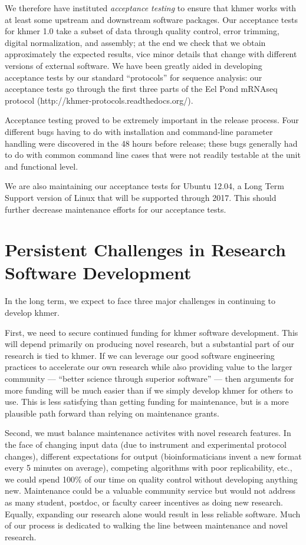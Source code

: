 \documentclass[12pt]{article}
\begin{document}
We therefore have instituted {\em acceptance testing} to ensure that
khmer works with at least some upstream and downstream software
packages.  Our acceptance tests for khmer 1.0 take a subset of data
through quality control, error trimming, digital normalization, and
assembly; at the end we check that we obtain approximately the
expected results, vice minor details that change with different
versions of external software.  We have been greatly aided in
developing acceptance tests by our standard ``protocols'' for sequence
analysis: our acceptance tests go through the first three parts of the
Eel Pond mRNAseq protocol (http://khmer-protocols.readthedocs.org/).

Acceptance testing proved to be extremely important in the release
process.  Four different bugs having to do with installation and
command-line parameter handling were discovered in the 48 hours before
release; these bugs generally had to do with common command line cases
that were not readily testable at the unit and functional level.

We are also maintaining our acceptance tests for Ubuntu 12.04, a Long
Term Support version of Linux that will be supported through 2017.
This should further decrease maintenance efforts for our acceptance
tests.

\section{Persistent Challenges in Research Software Development}

In the long term, we expect to face three major challenges in continuing
to develop khmer.

First, we need to secure continued funding for khmer software
development.  This will depend primarily on producing novel research,
but a substantial part of our research is tied to khmer.  If we can
leverage our good software engineering practices to accelerate our own
research while also providing value to the larger community ---
``better science through superior software'' --- then arguments for more
funding will be much easier than if we simply develop khmer for
others to use.  This is less satisfying than getting funding for maintenance,
but is a more plausible path forward than relying on maintenance grants.

Second, we must balance maintenance activites with novel research
features.  In the face of changing input data (due to instrument and
experimental protocol changes), different expectations for output
(bioinformaticians invent a new format every 5 minutes on average),
competing algorithms with poor replicability, etc., we could spend
100\% of our time on quality control without developing anything new.
Maintenance could be a valuable community service but would not address
as many student, postdoc, or faculty career incentives as doing new
research.  Equally, expanding our research alone would result in less
reliable software.  Much of our process is dedicated to walking the
line between maintenance and novel research.
\end{document}
